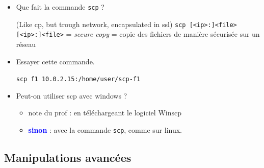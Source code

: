 \documentclass[a4paper]{article}
\begin{document}
\begin{itemize}
\item Que fait la commande \texttt{scp} ?
\begin{example}
    (Like cp, but trough network, encapsulated in ssl)
    \texttt{scp [<ip>:]<file> [<ip>:]<file>} = \textit{secure copy} = copie des fichiers de manière sécurisée sur un réseau
\end{example}

\item Essayer cette commande.
\begin{example}
    \texttt{scp f1 10.0.2.15:/home/user/scp-f1}
\end{example}

\item Peut-on utiliser scp avec windows ?
\begin{example}
    \begin{itemize}
        \item note du prof : en téléchargeant le logiciel Winscp
        \item \textcolor{blue}{\textbf{sinon}} : avec la commande \texttt{scp}, comme sur linux.
    \end{itemize}
\end{example}

\end{itemize}










\subsection{Manipulations avancées}
\end{document}
